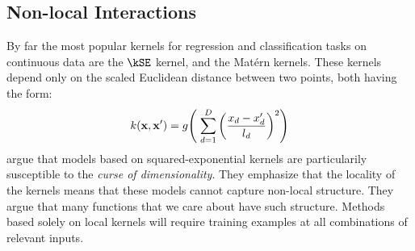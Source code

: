 \subsection{Non-local Interactions}
%
By far the most popular kernels for regression and classification tasks on continuous data are the $\kSE$ kernel, and the Mat\'{e}rn kernels.
These kernels depend only on the scaled Euclidean distance between two points, both having the form:
\begin{align}
k({\bf x, x'}) = g \!\left( \; \sum_{d=1}^D \left( \frac{  x_{d} - x_{d}' }{ l_d } \right)^2 \right)
\end{align}
\citet{bengio2006curse} argue that models based on squared-exponential kernels are particularily susceptible to the \textit{curse of dimensionality}.
They emphasize that the locality of the kernels means that these models cannot capture non-local structure. 
They argue that many functions that we care about have such structure.
Methods based solely on local kernels will require training examples at all combinations of relevant inputs.

